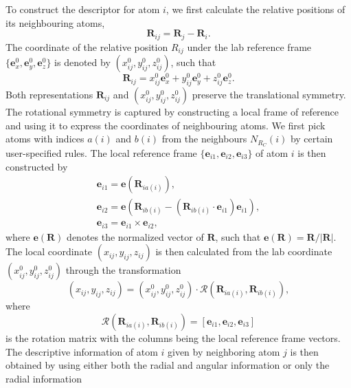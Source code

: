 To construct the descriptor for atom $i$, we first calculate the relative
positions of its neighbouring atoms,
\begin{equation}
  \mathbf{R}_{ij} = \mathbf{R}_j - \mathbf{R}_i.
\end{equation}
The coordinate of the relative position $R_{ij}$ under the lab reference frame
$\{\mathbf{e}_x^0, \mathbf{e}_y^0, \mathbf{e}_z^0\}$ is denoted by
$(x_{ij}^0, y_{ij}^0, z_{ij}^0)$, such that
\begin{equation}
  \mathbf{R}_{ij} = x_{ij}^0 \mathbf{e}_x^0 + y_{ij}^0 \mathbf{e}_y^0
    + z_{ij}^0 \mathbf{e}_z^0.
\end{equation}
Both representations $\mathbf{R}_{ij}$ and $(x_{ij}^0, y_{ij}^0, z_{ij}^0)$
preserve the translational symmetry. The rotational symmetry is captured by
constructing a local frame of reference and using it to express the
coordinates of neighbouring atoms. We first pick atoms with indices $a(i)$ and
$b(i)$ from the neighbours $N_{R_C}(i)$ by certain user-specified rules. The
local reference frame $\{\mathbf{e}_{i1}, \mathbf{e}_{i2}, \mathbf{e}_{i3} \}$
of atom $i$ is then constructed by
\begin{align}
  \mathbf{e}_{i1} = \mathbf{e}(\mathbf{R}_{ia(i)}), \\
  \mathbf{e}_{i2} = \mathbf{e}\left(
    \mathbf{R}_{ib(i)} -
    (\mathbf{R}_{i b(i)} \cdot \mathbf{e}_{i1}) \mathbf{e}_{i1}
  \right), \\
  \mathbf{e}_{i3} = \mathbf{e}_{i1} \times \mathbf{e}_{i2},
\end{align}
where $\mathbf{e}(\mathbf{R})$ denotes the normalized vector of $\mathbf{R}$,
such that $\mathbf{e}(\mathbf{R}) = \mathbf{R} / |\mathbf{R}|$. The local
coordinate $(x_{ij}, y_{ij}, z_{ij})$ is then calculated from the lab
coordinate $(x_{ij}^0, y_{ij}^0, z_{ij}^0)$ through the transformation
\begin{equation}
  (x_{ij}, y_{ij}, z_{ij}) = (x_{ij}^0, y_{ij}^0, z_{ij}^0) \cdot
    \mathcal{R}(\mathbf{R}_{i a(i)}, \mathbf{R}_{i b(i)}),
\end{equation}
where
\begin{equation}
  \mathcal{R}(\mathbf{R}_{i a(i)}, \mathbf{R}_{i b(i)}) =
    [\mathbf{e}_{i1}, \mathbf{e}_{i2}, \mathbf{e}_{i3}]
\end{equation}
is the rotation matrix with the columns being the local reference frame
vectors. The descriptive information of atom $i$ given by neighboring atom $j$
is then obtained by using either both the radial and angular information or
only the radial information
